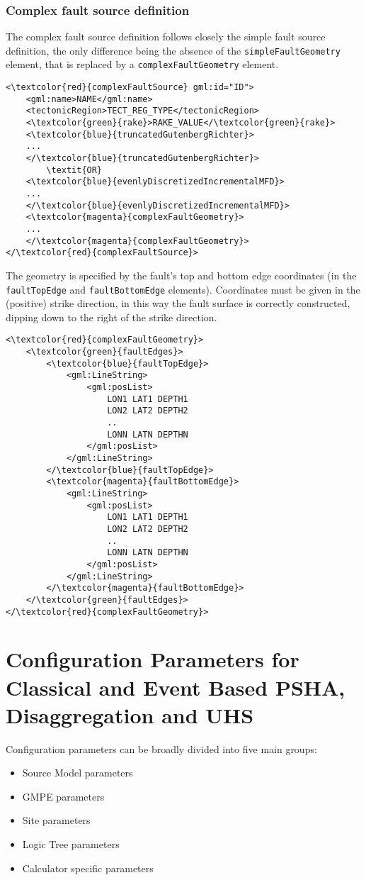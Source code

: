 \subsubsection{Complex fault source definition}
The complex fault source definition follows closely the simple fault source definition, the only difference being the absence of the \Verb+simpleFaultGeometry+ element, that is replaced by a \Verb+complexFaultGeometry+ element.
\begin{Verbatim}[frame=single, commandchars=\\\{\},fontsize=\normalsize, samepage=true]
<\textcolor{red}{complexFaultSource} gml:id="ID">
	<gml:name>NAME</gml:name>
	<tectonicRegion>TECT_REG_TYPE</tectonicRegion>
	<\textcolor{green}{rake}>RAKE_VALUE</\textcolor{green}{rake}>
	<\textcolor{blue}{truncatedGutenbergRichter}>
	...
	</\textcolor{blue}{truncatedGutenbergRichter}>
		\textit{OR}
	<\textcolor{blue}{evenlyDiscretizedIncrementalMFD}>
	...
	</\textcolor{blue}{evenlyDiscretizedIncrementalMFD}>
	<\textcolor{magenta}{complexFaultGeometry}>
	...
	</\textcolor{magenta}{complexFaultGeometry}>
</\textcolor{red}{complexFaultSource}>
\end{Verbatim}
The geometry is specified by the fault's top and bottom edge coordinates (in the \Verb+faultTopEdge+ and \Verb+faultBottomEdge+ elements). Coordinates must be given in the (positive) strike direction, in this way the fault surface is correctly constructed, dipping down to the right of the strike direction.
\begin{Verbatim}[frame=single, commandchars=\\\{\},fontsize=\normalsize, samepage=true]
<\textcolor{red}{complexFaultGeometry}>
	<\textcolor{green}{faultEdges}>
		<\textcolor{blue}{faultTopEdge}>
			<gml:LineString>
				<gml:posList>
					LON1 LAT1 DEPTH1
					LON2 LAT2 DEPTH2
					..
					LONN LATN DEPTHN
				</gml:posList>
			</gml:LineString>
		</\textcolor{blue}{faultTopEdge}>
		<\textcolor{magenta}{faultBottomEdge}>
			<gml:LineString>
				<gml:posList>
					LON1 LAT1 DEPTH1
					LON2 LAT2 DEPTH2
					..
					LONN LATN DEPTHN
				</gml:posList>
			</gml:LineString>
		</\textcolor{magenta}{faultBottomEdge}>
	</\textcolor{green}{faultEdges}>
</\textcolor{red}{complexFaultGeometry}>
\end{Verbatim}

\section{Configuration Parameters for Classical and Event Based PSHA, Disaggregation and UHS}
Configuration parameters can be broadly divided into five main groups:
\begin{itemize}
\item Source Model parameters
\item GMPE parameters
\item Site parameters
\item Logic Tree parameters
\item Calculator specific parameters
\end{itemize}

